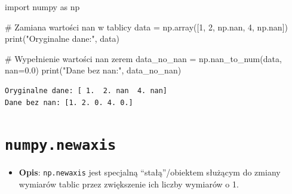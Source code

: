 \documentclass[
  letterpaper,
  DIV=11,
  numbers=noendperiod]{scrreprt}
\newenvironment{Shaded}{\begin{snugshade}}{\end{snugshade}}
\newcommand{\BuiltInTok}[1]{\textcolor[rgb]{0.00,0.23,0.31}{#1}}
\newcommand{\CommentTok}[1]{\textcolor[rgb]{0.37,0.37,0.37}{#1}}
\newcommand{\DecValTok}[1]{\textcolor[rgb]{0.68,0.00,0.00}{#1}}
\newcommand{\FloatTok}[1]{\textcolor[rgb]{0.68,0.00,0.00}{#1}}
\newcommand{\ImportTok}[1]{\textcolor[rgb]{0.00,0.46,0.62}{#1}}
\newcommand{\NormalTok}[1]{\textcolor[rgb]{0.00,0.23,0.31}{#1}}
\newcommand{\OperatorTok}[1]{\textcolor[rgb]{0.37,0.37,0.37}{#1}}
\newcommand{\StringTok}[1]{\textcolor[rgb]{0.13,0.47,0.30}{#1}}
\providecommand{\tightlist}{%
  \setlength{\itemsep}{0pt}\setlength{\parskip}{0pt}}\usepackage{longtable,booktabs,array}
\begin{document}
\begin{Shaded}
\begin{Highlighting}[]
\ImportTok{import}\NormalTok{ numpy }\ImportTok{as}\NormalTok{ np}

\CommentTok{\# Zamiana wartości nan w tablicy}
\NormalTok{data }\OperatorTok{=}\NormalTok{ np.array([}\DecValTok{1}\NormalTok{, }\DecValTok{2}\NormalTok{, np.nan, }\DecValTok{4}\NormalTok{, np.nan])}
\BuiltInTok{print}\NormalTok{(}\StringTok{"Oryginalne dane:"}\NormalTok{, data)}

\CommentTok{\# Wypełnienie wartości nan zerem}
\NormalTok{data\_no\_nan }\OperatorTok{=}\NormalTok{ np.nan\_to\_num(data, nan}\OperatorTok{=}\FloatTok{0.0}\NormalTok{)}
\BuiltInTok{print}\NormalTok{(}\StringTok{"Dane bez nan:"}\NormalTok{, data\_no\_nan)}
\end{Highlighting}
\end{Shaded}

\begin{verbatim}
Oryginalne dane: [ 1.  2. nan  4. nan]
Dane bez nan: [1. 2. 0. 4. 0.]
\end{verbatim}

\section{\texorpdfstring{\texttt{numpy.newaxis}}{numpy.newaxis}}\label{numpy.newaxis}

\begin{itemize}
\tightlist
\item
  \textbf{Opis}: \texttt{np.newaxis} jest specjalną ``stałą''/obiektem
  służącym do zmiany wymiarów tablic przez zwiększenie ich liczby
  wymiarów o 1.
\end{itemize}
\end{document}
